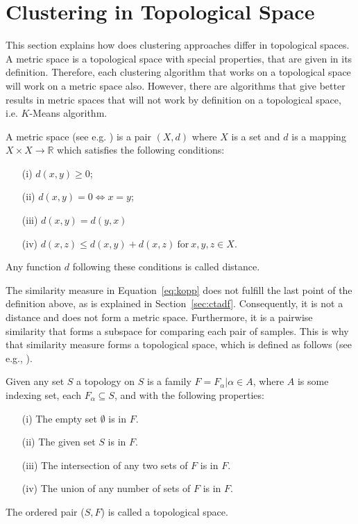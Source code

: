 \documentclass[thesis=B,english]{FITthesis}[2012/10/20]
\begin{document}
\section{Clustering in Topological Space}\label{sec:cluster_topo}
This section explains how does clustering approaches differ in topological spaces.
A metric space is a topological space with special properties, that are given in its definition.
Therefore, each clustering algorithm that works on a topological space will work on a metric space also.
However, there are algorithms that give better results in metric spaces that will not work by definition on a topological space, i.e. $K$-Means algorithm.

A metric space (see e.g. \cite{choudhary1992elements}) is a pair $(X, d)$ where $X$ is a set and $d$ is a mapping $X \times X \to \mathbb{R}$ which satisfies the following conditions:
\begin{enumerate}
    \item [(i)] $d(x, y) \geq 0$;
    \item [(ii)] $d(x, y) = 0 \iff x = y$;
    \item [(iii)] $d(x, y) = d(y, x)$
    \item [(iv)] $d(x, z) \leq d(x, y) + d(x, z) \  \mathrm{for} \  x, y, z \in X$.
\end{enumerate}
Any function $d$ following these conditions is called distance.

The similarity measure in Equation~\ref{eq:kopp} does not fulfill the last point of the definition above, as is explained in Section~\ref{sec:ctadf}.
Consequently, it is not a distance and does not form a metric space. Furthermore, it is a pairwise similarity that forms a subspace for comparing each pair of samples.
This is why that similarity measure forms a topological space, which is defined as follows (see e.g., \cite{stahl2014introduction}).

Given any set $S$ a topology on $S$ is a family $F ={F_{\alpha} | \alpha \in A}$, where $A$ is some indexing set, each $F_{\alpha}  \subseteq S$, and with the following properties:
\begin{enumerate}
    \item [(i)] The empty set $\emptyset$ is in $F$.
    \item [(ii)] The given set $S$ is in $F$.
    \item [(iii)] The intersection of any two sets of $F$ is in $F$.
    \item [(iv)] The union of any number of sets of $F$ is in $F$.
\end{enumerate}
The ordered pair ($S, F$) is called a topological space.
\end{document}
